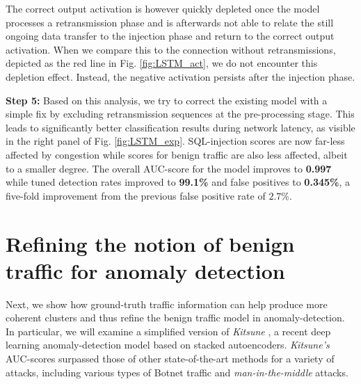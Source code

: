 \documentclass[10pt,conference]{IEEEtran}
\begin{document}
The correct output activation is however quickly depleted once the model processes a retransmission phase and is afterwards not able to relate the still ongoing data transfer to the injection phase and return to the correct output activation. When we compare this to the connection without retransmissions, depicted as the red line in Fig. \ref{fig:LSTM_act}, we do not encounter this depletion effect. Instead, the negative activation persists after the injection phase.

\textbf{Step 5:} Based on this analysis, we try to correct the existing model with a simple fix by excluding retransmission sequences at the pre-processing stage. This leads to significantly better classification results during network latency, as visible in the right panel of Fig. \ref{fig:LSTM_exp}. SQL-injection scores are now far-less affected by congestion while scores for benign traffic are also less affected, albeit to a smaller degree.
The overall AUC-score for the model improves to \textbf{0.997} while tuned detection rates improved to \textbf{99.1\%} and false positives to \textbf{0.345\%}, a five-fold improvement from the previous false positive rate of $2.7\%$. 

\section{Refining the notion of benign traffic for anomaly detection}\label{Sec:Refining}

Next, we show how ground-truth traffic information can help produce more coherent clusters and thus refine the benign traffic model in anomaly-detection. In particular, we will examine a 
simplified version of \textit{Kitsune} \cite{mirsky2018kitsune}, a recent deep learning anomaly-detection model based on stacked autoencoders. \textit{Kitsune's} AUC-scores surpassed those of other state-of-the-art methods for a variety of attacks, including various types of Botnet traffic and \textit{man-in-the-middle} attacks.
\end{document}
